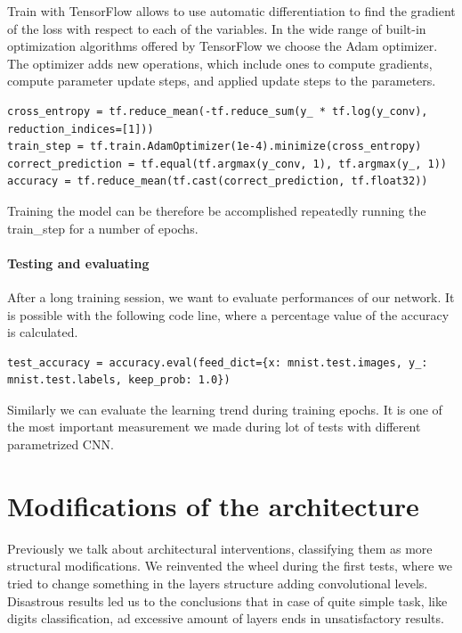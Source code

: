 Train with TensorFlow allows to use automatic differentiation to find the gradient of the loss with respect to each of the variables. In the wide range of built-in optimization algorithms offered by TensorFlow we choose the Adam optimizer. The optimizer adds new operations, which include ones to compute gradients, compute parameter update steps, and applied update steps to the parameters.

\begin{lstlisting}
cross_entropy = tf.reduce_mean(-tf.reduce_sum(y_ * tf.log(y_conv), reduction_indices=[1]))
train_step = tf.train.AdamOptimizer(1e-4).minimize(cross_entropy)
correct_prediction = tf.equal(tf.argmax(y_conv, 1), tf.argmax(y_, 1))
accuracy = tf.reduce_mean(tf.cast(correct_prediction, tf.float32))
\end{lstlisting}

Training the model can be therefore be accomplished repeatedly running the train\_step for a number of epochs.

\paragraph{Testing and evaluating}

After a long training session, we want to evaluate performances of our network. It is possible with the following code line, where a percentage value of the accuracy is calculated.

\begin{lstlisting}
test_accuracy = accuracy.eval(feed_dict={x: mnist.test.images, y_: mnist.test.labels, keep_prob: 1.0})
\end{lstlisting}

Similarly we can evaluate the learning trend during training epochs. It is one of the most important measurement we made during lot of tests with different parametrized \acs{CNN}.

\section{Modifications of the architecture}

Previously we talk about architectural interventions, classifying them as more structural modifications. We reinvented the wheel during the first tests, where we tried to change something in the layers structure adding convolutional levels. Disastrous results led us to the conclusions that in case of quite simple task, like digits classification, ad excessive amount of layers ends in unsatisfactory results.

